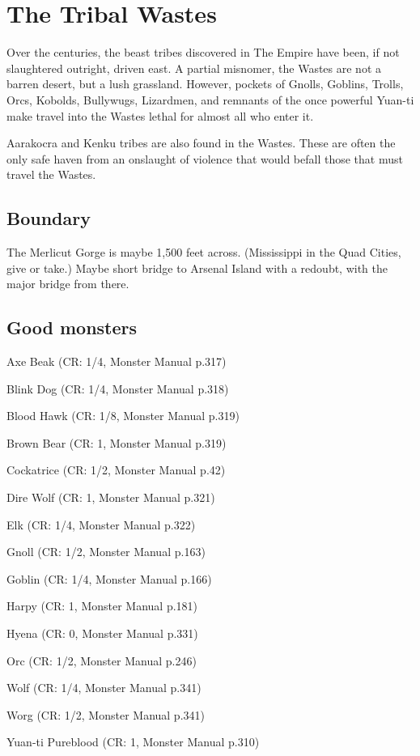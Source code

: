 \section{The Tribal Wastes}

Over the centuries, the beast tribes discovered in The Empire have been,
 if not slaughtered outright, driven east.
A partial misnomer, the Wastes are not a barren desert, but a lush grassland.
However, pockets of Gnolls, Goblins, Trolls, Orcs, Kobolds, Bullywugs, Lizardmen, and
 remnants of the once powerful Yuan-ti make travel into the Wastes lethal for almost
 all who enter it.

Aarakocra and Kenku tribes are also found in the Wastes.
These are often the only safe haven from an onslaught of violence that would befall those
 that must travel the Wastes.

\subsection{Boundary}
The Merlicut Gorge is maybe 1,500 feet across.
(Mississippi in the Quad Cities, give or take.)
Maybe short bridge to Arsenal Island with a redoubt, with the major bridge from there.



\subsection{Good monsters}

Axe Beak (CR: 1/4, Monster Manual p.317)

Blink Dog (CR: 1/4, Monster Manual p.318)

Blood Hawk (CR: 1/8, Monster Manual p.319)

Brown Bear (CR: 1, Monster Manual p.319)

Cockatrice (CR: 1/2, Monster Manual p.42)

Dire Wolf (CR: 1, Monster Manual p.321)

Elk (CR: 1/4, Monster Manual p.322)

Gnoll (CR: 1/2, Monster Manual p.163)

Goblin (CR: 1/4, Monster Manual p.166)

Harpy (CR: 1, Monster Manual p.181)

Hyena (CR: 0, Monster Manual p.331)

Orc (CR: 1/2, Monster Manual p.246)

Wolf (CR: 1/4, Monster Manual p.341)

Worg (CR: 1/2, Monster Manual p.341)

Yuan-ti Pureblood (CR: 1, Monster Manual p.310)


